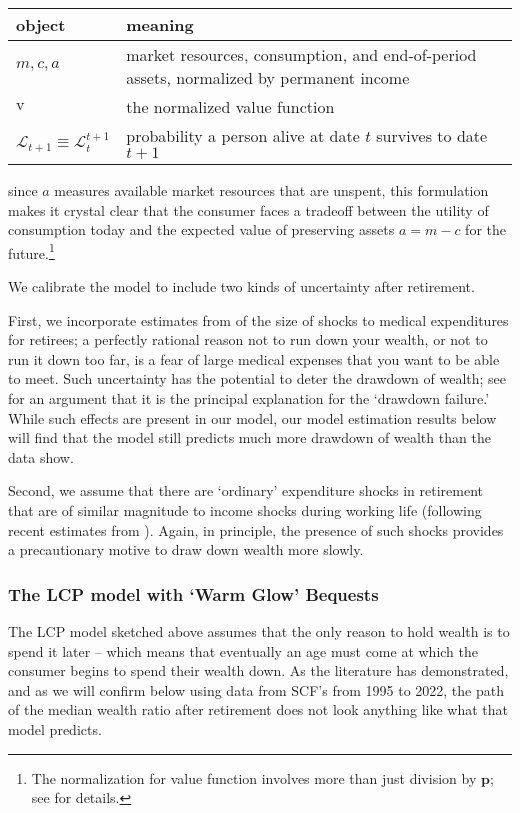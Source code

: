 \documentclass{article}
\newcommand{\pLvl}{\mathbf{p}}
\newcommand{\vFunc}{\mathrm{v}}
\newcommand{\Alive}{\mathcal{L}}
\newcommand{\cNrm}{c}
\newcommand{\aNrm}{a}
\newcommand{\mNrm}{m}
\begin{document}
\bigskip\noindent
\begin{tabular}{p{}p{}}
\toprule
object & meaning \\
\hline
$\mNrm, \cNrm, \aNrm$ & market resources, consumption, and end-of-period assets, normalized by permanent income \\
$\vFunc$ & the normalized value function \\
$\Alive_{t+1} \equiv \Alive_{t}^{t+1}$ & probability a person alive at date $t$ survives to date $t+1$ \\
\bottomrule
\end{tabular}

\bigskipand since $\aNrm$ measures available market resources that are unspent, this formulation makes it crystal clear that the consumer faces a tradeoff between the utility of consumption today and the expected value of preserving assets $\aNrm=\mNrm -\cNrm$ for the future.\footnote{The normalization for value function involves more than just division by $\pLvl$; see \cite{BufferStockTheory} for details.}

We calibrate the model to include two kinds of uncertainty after retirement.

First, we incorporate estimates from \cite{Cagetti2003} of the size of shocks to medical expenditures for retirees; a perfectly rational reason not to run down your wealth, or not to run it down too far, is a fear of large medical expenses that you want to be able to meet.  Such uncertainty has the potential to deter the drawdown of wealth; see \cite{Ameriks2020jpe} for an argument that it is the principal explanation for the `drawdown failure.'  While such effects are present in our model, our model estimation results below will find that the model still predicts much more drawdown of wealth than the data show.

Second, we assume that there are `ordinary' expenditure shocks in retirement that are of similar magnitude to income shocks during working life (following recent estimates from  \cite{flExpShocks}).  Again, in principle, the presence of such shocks provides a precautionary motive to draw down wealth more slowly.

\subsubsection{The LCP model with `Warm Glow' Bequests}

The LCP model sketched above assumes that the only reason to hold wealth is to spend it later -- which means that eventually an age must come at which the consumer begins to spend their wealth down. As the literature has demonstrated, and as we will confirm below using data from SCF's from 1995 to 2022, the path of the median wealth ratio after retirement does not look anything like what that model predicts.
\end{document}

